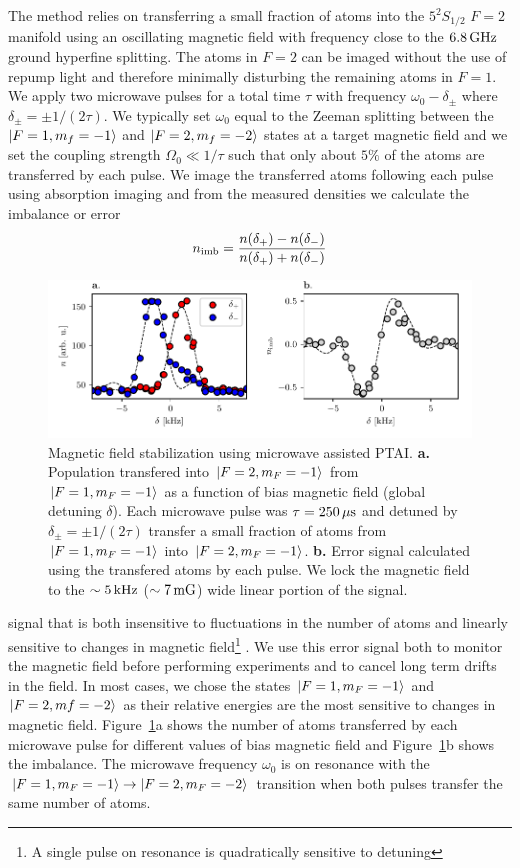 \documentclass[
superscriptaddress,
amsmath,
amssymb,
aps,
prl,
twocolumn,
floatfix
]{revtex4-1}
\def\ket#1{\mathinner{|{#1}\rangle}}
\begin{document}
The method relies on transferring a small fraction of atoms into the $5^2S_{1/2}$ $F=2$ manifold using an oscillating magnetic field with frequency close to the $\unit[6.8]{GHz}$ ground hyperfine splitting. The atoms in $F=2$ can be imaged without the use of repump light and therefore minimally disturbing the remaining atoms in $F=1$. We apply two microwave pulses for a total time $\tau$ with frequency $\omega_0-\delta_{\pm}$ where $\delta_{\pm}=\pm1/(2\tau)$. We typically set $\omega_0$ equal to the Zeeman splitting between the $\ket{F=1, m_f=-1}$ and $\ket{F=2, m_f=-2}$ states at a target magnetic field and we set the coupling strength $\Omega_0\ll 1/\tau$ such that only about $5\%$ of the atoms are transferred by each pulse. We image the transferred atoms following each pulse using absorption imaging and from the measured densities we calculate the imbalance or error
%
\begin{equation}
 	n_{\rm{imb}}=\frac{n(\delta_+)-n(\delta_-)}{n(\delta_+)+n(\delta_-)}
 \end{equation} 
%
\begin{figure}[htb]
\begin{center}
\includegraphics[]{Figures/uwave_lock.pdf}
\caption[Magnetic field stabilization using microwave assisted PTAI]{Magnetic field stabilization using microwave assisted PTAI. {\bf a.} Population transfered into $\ket{F=2, m_F=-1}$ from $\ket{F=1, m_F=-1}$ as a function of bias magnetic field (global detuning $\delta$). Each microwave pulse was $\tau=\unit[250]{\mu s}$ and detuned by $\delta_{\pm}=\pm 1/(2\tau)$ transfer a small fraction of atoms from $\ket{F=1, m_F=-1}$ into $\ket{F=2, m_F=-1}$. {\bf b.} Error signal calculated using the transfered atoms by each pulse. We lock the magnetic field to the $\sim\unit[5]{kHz}$ ($\unit[\sim 7]{mG}$) wide linear portion of the signal.}
\label{fig:uwave_lock}
\end{center}
\end{figure}
signal that is both insensitive to fluctuations in the number of atoms and linearly sensitive to changes in magnetic field\footnote{A single pulse on resonance is quadratically sensitive to detuning} . We use this error signal both to monitor the magnetic field before performing experiments and to cancel long term drifts in the field. In most cases, we chose the states $\ket{F=1, m_F=-1}$ and $\ket{F=2, mf=-2}$ as their relative energies are the most sensitive to changes in magnetic field. Figure~\ref{fig:uwave_lock}a shows the number of atoms transferred by each microwave pulse for different values of bias magnetic field and Figure~\ref{fig:uwave_lock}b shows the imbalance. The microwave frequency $\omega_0$ is on resonance with the $\ket{F=1, m_F=-1}\rightarrow\ket{F=2, m_F=-2}$ transition when both pulses transfer the same number of atoms.
\end{document}
